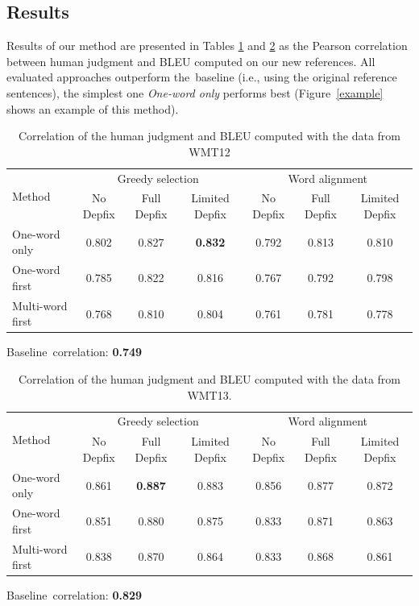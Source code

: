 \documentclass[11pt]{article}
\def\Fref#1{Figure~\ref{#1}}
\begin{document}
\subsection{Results}
Results of our method are presented in Tables \ref{corrs12} and \ref{corrs13}
as the Pearson correlation between human judgment and BLEU computed on our new
references. All evaluated approaches outperform the~baseline (i.e., using the 
original reference sentences), the simplest one \textit{One-word only} performs 
best (\Fref{example} shows an example of this method).

\begin{table}[tb]
\begin{center}
\begin{tabular}{l|ccc|ccc}
\multirow{2}{*}{Method} & \multicolumn{3}{c|}{Greedy selection} & \multicolumn{3}{c}{Word alignment} \\
& No Depfix & Full Depfix & Limited Depfix & No Depfix & Full Depfix & Limited Depfix\\
\hline
One-word only     & 0.802 & 0.827 & \textbf{0.832} & 0.792 & 0.813 & 0.810 \\
One-word first    & 0.785 & 0.822 & 0.816 & 0.767 & 0.792 & 0.798 \\
Multi-word first & 0.768 & 0.810 & 0.804 & 0.761 & 0.781 & 0.778 \\
\end{tabular}

\vspace{10pt}

Baseline~correlation: \textbf{0.749}
\caption{Correlation of the human judgment and BLEU computed with the data from WMT12}
\label{corrs12}
\end{center}
\end{table}

\begin{table}[tb]
\begin{center}
\begin{tabular}{l|ccc|ccc}
\multirow{2}{*}{Method} & \multicolumn{3}{c|}{Greedy selection} & \multicolumn{3}{c}{Word alignment} \\
& No Depfix & Full Depfix & Limited Depfix & No Depfix & Full Depfix & Limited Depfix\\
\hline
One-word only     & 0.861 & \textbf{0.887} & 0.883 & 0.856 & 0.877 & 0.872 \\
One-word first    & 0.851 & 0.880 & 0.875 & 0.833 & 0.871 & 0.863 \\
Multi-word first  & 0.838 & 0.870 & 0.864 & 0.833 & 0.868 & 0.861 \\
\end{tabular}

\vspace{10pt}

Baseline~correlation: \textbf{0.829}
\caption{Correlation of the human judgment and BLEU computed with the data from WMT13.}
\label{corrs13}
\end{center}
\end{table}
 
\end{document}
